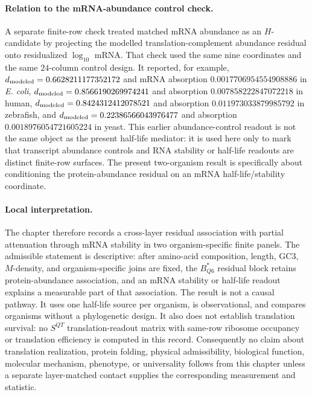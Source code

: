 \paragraph{Relation to the mRNA-abundance control check.} A separate finite-row check treated matched mRNA abundance as an $H$-candidate by projecting the modelled translation-complement abundance residual onto residualized $\log_{10}$ mRNA.  That check used the same nine coordinates and the same $24$-column control design.  It reported, for example, $d_{\rm modeled}=0.6628211177352172$ and mRNA absorption $0.0017706954554908886$ in \emph{E. coli}, $d_{\rm modeled}=0.8566190269974241$ and absorption $0.007858222847072218$ in human, $d_{\rm modeled}=0.8424312412078521$ and absorption $0.011973033879985792$ in zebrafish, and $d_{\rm modeled}=0.22386566043976477$ and absorption $0.0018976054721605224$ in yeast.  This earlier abundance-control readout is not the same object as the present half-life mediator: it is used here only to mark that transcript abundance controls and RNA stability or half-life readouts are distinct finite-row surfaces.  The present two-organism result is specifically about conditioning the protein-abundance residual on an mRNA half-life/stability coordinate.

\paragraph{Local interpretation.} The chapter therefore records a cross-layer residual association with partial attenuation through mRNA stability in two organism-specific finite panels.  The admissible statement is descriptive: after amino-acid composition, length, GC3, $M$-density, and organism-specific joins are fixed, the $B^*_{Q6}$ residual block retains protein-abundance association, and an mRNA stability or half-life readout explains a measurable part of that association.  The result is not a causal pathway.  It uses one half-life source per organism, is observational, and compares organisms without a phylogenetic design.  It also does not establish translation survival: no $S^{QT}$ translation-readout matrix with same-row ribosome occupancy or translation efficiency is computed in this record.  Consequently no claim about translation realization, protein folding, physical admissibility, biological function, molecular mechanism, phenotype, or universality follows from this chapter unless a separate layer-matched contact supplies the corresponding measurement and statistic.